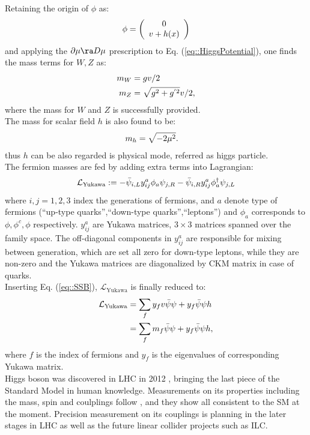 Retaining the origin of $\phi$ as:
\begin{align}
\phi = \left( \begin{array}{c} 0 \\ v+h(x) \end{array} \right)
\label{eq::SSB}
\end{align}
and applying the $\partial\mu \ra D\mu$ prescription to Eq. (\ref{eq::HiggsPotential}),
one finds the mass terms for $W,Z$ as:
\begin{align}
m_W & = gv/2 \nonumber \\
m_Z & = \sqrt{g^2+g^{' 2}} v/2, \nonumber
\end{align}
where the mass for $W$ and $Z$ is successfully provided.\\

The mass for scalar field $h$ is also found to be:
\begin{align}
m_h & = \sqrt{-2\mu^2}.  \nonumber
\end{align}
thus $h$ can be also regarded is physical mode, referred as higgs particle. \\

The fermion masses are fed by adding extra terms into Lagrangian:
\begin{align}
\mathcal{L}_\mathrm{Yukawa} := -\bar{\psi}_{i,L} y^{a}_{ij} \phi_a \psi_{j,R} -\bar{\psi}_{i,R} y^{a}_{ij} \phi^\dagger_a \psi_{j,L} 
\label{SMLagYukawa}
\end{align}
where $i, j=1, 2, 3$ index the generations of fermions, and $a$ denote type of fermions (``up-type quarks'',``down-type quarks'',``leptons'') and $\phi_a$ corresponds to $\phi, \phi^{c}, \phi$ respectively. $y^a_{ij}$ are Yukawa matrices, $3\times 3$ matrices spanned over the family space.
The off-diagonal components in $y^a_{ij}$ are responsible for mixing between generation, which are set all zero for down-type leptons, while they are non-zero and the Yukawa matrices are diagonalized by CKM matrix \cite{CPVKM} in case of quarks. \\

Inserting Eq. (\ref{eq::SSB}), $\mathcal{L}_{\mathrm{Yukawa}}$ is finally reduced to:
\begin{align}
\mathcal{L}_{\mathrm{Yukawa}} & = \sum_f y_f v \bar{\psi} \psi + y_f \bar{\psi}{\psi} h \nonumber \\
& = \sum_f m_f \bar{\psi} \psi + y_f \bar{\psi}{\psi} h,
\end{align}
where $f$ is the index of fermions and $y_f$ is the eigenvalues of corresponding Yukawa matrix. \\

Higgs boson was discovered in LHC in 2012 \cite{HiggsDiscATLAS}\cite{HiggsDiscCMS}, bringing the last piece of the Standard Model in human knowledge. Measurements on its properties including the mass, spin and coulplings follow 
, and they show all consistent to the SM at the moment. Precision measurement on its couplings is planning in the later stages in LHC as well as the future linear collider projects such as ILC.


